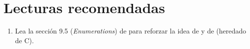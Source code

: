 \section{Lecturas recomendadas}

\begin{enumerate}

\item Lea la sección 9.5 (\emph{Enumerations}) 
      de \pppbook{}
      para reforzar la idea de  y de 
       (heredado de C).

\end{enumerate}
